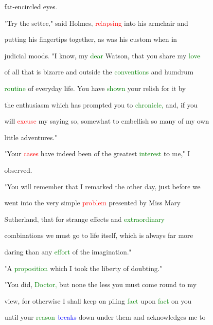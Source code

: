  fat-encircled eyes.



 "Try the settee," said Holmes, \textcolor{red}{relapsing} into his armchair and

 putting his fingertips together, as was his custom when in

 \textcolor{BurntOrange}{judicial} moods. "I know, my \textcolor{green}{dear} Watson, that you \textcolor{BurntOrange}{share} my \textcolor{green}{love}

 of all that is \textcolor{BurntOrange}{bizarre} and outside the \textcolor{green}{conventions} and humdrum

 \textcolor{green}{routine} of everyday life. You have \textcolor{green}{shown} your relish for it by

 the \textcolor{BurntOrange}{enthusiasm} which has prompted you to \textcolor{green}{chronicle,} and, if you

 will \textcolor{red}{excuse} my saying so, somewhat to embellish so many of my own

 little \textcolor{BurntOrange}{adventures."}



 "Your \textcolor{red}{cases} have indeed been of the greatest \textcolor{green}{interest} to me," I

 observed.



 "You will remember that I remarked the other day, just before we

 went into the very simple \textcolor{red}{problem} \textcolor{BurntOrange}{presented} by Miss Mary

 Sutherland, that for strange effects and \textcolor{green}{extraordinary}

 combinations we must go to life itself, which is always far more

 \textcolor{BurntOrange}{daring} than any \textcolor{green}{effort} of the imagination."



 "A \textcolor{green}{proposition} which I took the \textcolor{BurntOrange}{liberty} of \textcolor{BurntOrange}{doubting."}



 "You did, \textcolor{green}{Doctor,} but none the less you must come round to my

 view, for otherwise I shall keep on piling \textcolor{green}{fact} upon \textcolor{green}{fact} on you

 until your \textcolor{green}{reason} \textcolor{blue}{breaks} down under them and acknowledges me to

